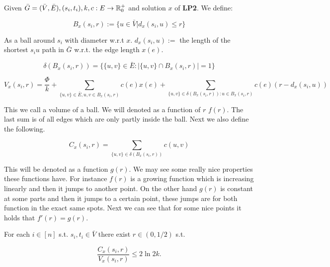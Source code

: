 Given $\bar{G} = (\bar{V}, \bar{E}), (s_{i}, t_{i}), k, c: E \to \mathbb{R}_{0}^{+}$ and solution $x$ of \textbf{LP2}. We define:

$$
B_{x}(s_{i}, r) := \{u \in \bar{V} | d_{x} (s_{i}, u) \leq r\}
$$

As a ball around $s_{i}$ with diameter w.r.t $x$. $d_{x} (s_{i}, u) :=$ the length of the shortest $s_{i}u$ path in $\bar{G}$ w.r.t. the edge length $x(e)$.

$$
\delta (B_{x}(s_{i}, r)) = \{\{u,v\} \in \bar{E} : |\{u,v\} \cap B_{x}(s_{i}, r)| = 1\}
$$

$$
V_{x}(s_{i}, r) = \frac{\Phi}{k} + \sum_{\{u,v\} \in \bar{E}, u,v \in B_{x}(s_{i},r)} c(e)x(e) + \sum_{\{u,v\} \in \delta(B_{x}(s_{i},r)): u \in B_{x}(s_{i},r)} c(e) (r - d_{x}(s_{i}, u))
$$

This we call a volume of a ball. We will denoted as a function of $r$ $f(r)$. The last sum is of all edges which are only partly inside the ball. Next we also define the following.

$$
C_{x}(s_{i}, r) = \sum_{\{u,v\} \in \delta(B_{x}(s_{i},r))} c(u,v)
$$

This will be denoted as a function $g(r)$. We may see some really nice properties these functions have. For instance $f(r)$ is a growing function which is increasing linearly and then it jumps to another point. On the other hand $g(r)$ is constant at some parts and then it jumps to a certain point, these jumps are for both function in the exact same spots. Next we can see that for some nice points it holds that $f'(r) = g(r)$.

\begin{lemma}
	For each $i \in [n]$ s.t. $s_{i}, t_{i} \in \bar{V}$ there exist $r \in (0, 1/2)$ s.t.
	
	$$
	\frac{C_{x}(s_{i}, r)}{V_{x}(s_{i},r)} \leq 2 \ln 2k.
	$$
\end{lemma}

